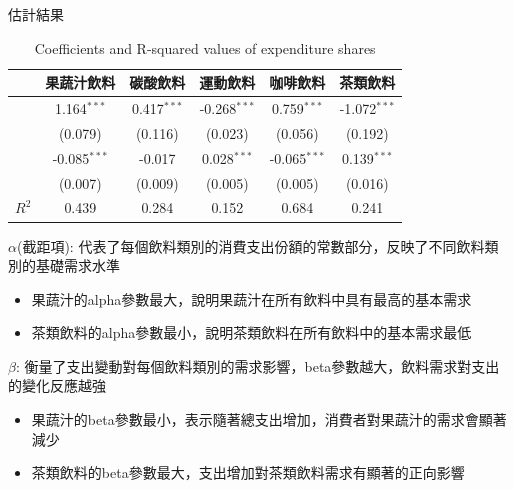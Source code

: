 \documentclass[12pt]{beamer}
\begin{document}
\begin{frame}{估計結果}
    \begin{table}[h]
    \centering
    \footnotesize{
    \begin{tabular}{lccccc}
        \hline & 果蔬汁飲料 & 碳酸飲料 & 運動飲料 & 咖啡飲料 & 茶類飲料 \\
		\hline 
		& \phantom{3}1.164$^{***}$ & \phantom{3}0.417$^{***}$ & \phantom{3}-0.268$^{***}$ & \phantom{3}0.759$^{***}$ & \phantom{3}-1.072$^{***}$ \\[-2ex]
		\raisebox{2ex}{$\alpha$} & (0.079) & (0.116) & (0.023) & (0.056) & (0.192) \\[0ex]
		& \phantom{3}-0.085$^{***}$ & -0.017 & \phantom{3}0.028$^{***}$ & \phantom{3}-0.065$^{***}$ & \phantom{3}0.139$^{***}$ \\[-2ex]
		\raisebox{2ex}{$\beta$} & (0.007) & (0.009) & (0.005) & (0.005) & (0.016) \\[0ex]
		\hline
		$R^2$ & 0.439 & 0.284 & 0.152 & 0.684 & 0.241 \\
        \hline
    \end{tabular}}
    \caption{Coefficients and R-squared values of expenditure shares}
    \end{table}

	$\alpha$(截距項): 代表了每個飲料類別的消費支出份額的常數部分，反映了不同飲料類別的基礎需求水準
	\begin{itemize}
		\item 果蔬汁的alpha參數最大，說明果蔬汁在所有飲料中具有最高的基本需求
		\item 茶類飲料的alpha參數最小，說明茶類飲料在所有飲料中的基本需求最低
	\end{itemize}

	$\beta$: 衡量了支出變動對每個飲料類別的需求影響，beta參數越大，飲料需求對支出的變化反應越強
	\begin{itemize}
		\item 果蔬汁的beta參數最小，表示隨著總支出增加，消費者對果蔬汁的需求會顯著減少
		\item 茶類飲料的beta參數最大，支出增加對茶類飲料需求有顯著的正向影響
	\end{itemize}
\end{frame}
\end{document}
